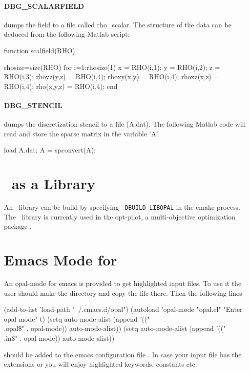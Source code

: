 \paragraph{DBG\_SCALARFIELD} dumps the field to a file called rho\_scalar. The structure of the data can be deduced from the following Matlab script:

\begin{footnotesize}
\begin{example}
function scalfield(RHO)

rhosize=size(RHO)
for i=1:rhosize(1)
  x = RHO(i,1);
  y = RHO(i,2);
  z = RHO(i,3);
  rhoyz(y,z) = RHO(i,4);
  rhoxy(x,y) = RHO(i,4);
  rhoxz(x,z) = RHO(i,4);
  rho(x,y,z) = RHO(i,4);
end
\end{example}
\end{footnotesize}

\paragraph{DBG\_STENCIL} dumps the discretization stencil to a file (A.dat). The following Matlab code will read and store the sparse matrix in the variable 'A'.

\begin{footnotesize}
\begin{example}
load A.dat;
A = spconvert(A);
\end{example}
\end{footnotesize}

\section{\opal~as a Library}
An \opal~library can be build by specifying \texttt{-DBUILD\_LIBOPAL} in the cmake process. The \opal~library is currently used in the opt-pilot, a multi-objective
optimization package \cite{bib:optpilot1}.

\section{Emacs Mode for \opal}
An opal-mode for emacs is provided to get highlighted input files. To use it the user should make the directory  and copy the file  there. Then the following lines
\begin{footnotesize}
\begin{example}
(add-to-list 'load-path "~/.emacs.d/opal")
(autoload 'opal-mode "opal.el" "Enter opal mode" t)
(setq auto-mode-alist (append '(("\\.opal\$" . opal-mode)) auto-mode-alist))
(setq auto-mode-alist (append '(("\\.in\$" . opal-mode)) auto-mode-alist))
\end{example}
\end{footnotesize}
should be added to the emacs configuration file . In case your input file has the extensions  or   you will enjoy highlighted
keywords, constants etc.

